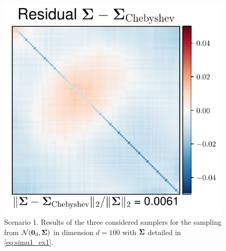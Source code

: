 \documentclass[nohypdvips,onefignum,onetabnum]{siamart171218}
\begin{document}
\begin{figure}
  \mbox{{\includegraphics[scale=0.4]{images/simu1_ex1_A_Cheby.pdf}}}
\caption{Scenario 1. Results of the three considered samplers for the sampling from $\mathcal{N}(\mathbf{0}_d,\mathbf{\Sigma})$ in dimension $d = 100$ with $\mathbf{\Sigma}$ detailed in \cref{eq:simu1_ex1}.}
  \label{fig:simu1_distrib_eigenvalues}
\end{figure}
\end{document}
